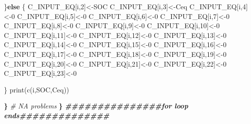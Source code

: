 \documentclass[
  10pt,
  b5paper,
]{book}
\newenvironment{Shaded}{\begin{snugshade}}{\end{snugshade}}
\newcommand{\CommentTok}[1]{\textcolor[rgb]{0.56,0.35,0.01}{\textit{#1}}}
\newcommand{\ControlFlowTok}[1]{\textcolor[rgb]{0.13,0.29,0.53}{\textbf{#1}}}
\newcommand{\DecValTok}[1]{\textcolor[rgb]{0.00,0.00,0.81}{#1}}
\newcommand{\DocumentationTok}[1]{\textcolor[rgb]{0.56,0.35,0.01}{\textbf{\textit{#1}}}}
\newcommand{\ErrorTok}[1]{\textcolor[rgb]{0.64,0.00,0.00}{\textbf{#1}}}
\newcommand{\FunctionTok}[1]{\textcolor[rgb]{0.00,0.00,0.00}{#1}}
\newcommand{\NormalTok}[1]{#1}
\newcommand{\OtherTok}[1]{\textcolor[rgb]{0.56,0.35,0.01}{#1}}
\begin{document}
\begin{Shaded}
\begin{Highlighting}[]
\NormalTok{    \}}\ControlFlowTok{else}\NormalTok{ \{}
\NormalTok{      C\_INPUT\_EQ[i,}\DecValTok{2}\NormalTok{]}\OtherTok{\textless{}{-}}\NormalTok{SOC}
\NormalTok{      C\_INPUT\_EQ[i,}\DecValTok{3}\NormalTok{]}\OtherTok{\textless{}{-}}\NormalTok{Ceq}
\NormalTok{      C\_INPUT\_EQ[i,}\DecValTok{4}\NormalTok{]}\OtherTok{\textless{}{-}}\DecValTok{0}
\NormalTok{      C\_INPUT\_EQ[i,}\DecValTok{5}\NormalTok{]}\OtherTok{\textless{}{-}}\DecValTok{0}
\NormalTok{      C\_INPUT\_EQ[i,}\DecValTok{6}\NormalTok{]}\OtherTok{\textless{}{-}}\DecValTok{0}
\NormalTok{      C\_INPUT\_EQ[i,}\DecValTok{7}\NormalTok{]}\OtherTok{\textless{}{-}}\DecValTok{0}
\NormalTok{      C\_INPUT\_EQ[i,}\DecValTok{8}\NormalTok{]}\OtherTok{\textless{}{-}}\DecValTok{0}
\NormalTok{      C\_INPUT\_EQ[i,}\DecValTok{9}\NormalTok{]}\OtherTok{\textless{}{-}}\DecValTok{0}
\NormalTok{      C\_INPUT\_EQ[i,}\DecValTok{10}\NormalTok{]}\OtherTok{\textless{}{-}}\DecValTok{0}
\NormalTok{      C\_INPUT\_EQ[i,}\DecValTok{11}\NormalTok{]}\OtherTok{\textless{}{-}}\DecValTok{0}
\NormalTok{      C\_INPUT\_EQ[i,}\DecValTok{12}\NormalTok{]}\OtherTok{\textless{}{-}}\DecValTok{0}
\NormalTok{      C\_INPUT\_EQ[i,}\DecValTok{13}\NormalTok{]}\OtherTok{\textless{}{-}}\DecValTok{0}
\NormalTok{      C\_INPUT\_EQ[i,}\DecValTok{14}\NormalTok{]}\OtherTok{\textless{}{-}}\DecValTok{0}
\NormalTok{      C\_INPUT\_EQ[i,}\DecValTok{15}\NormalTok{]}\OtherTok{\textless{}{-}}\DecValTok{0}
\NormalTok{      C\_INPUT\_EQ[i,}\DecValTok{16}\NormalTok{]}\OtherTok{\textless{}{-}}\DecValTok{0}
\NormalTok{      C\_INPUT\_EQ[i,}\DecValTok{17}\NormalTok{]}\OtherTok{\textless{}{-}}\DecValTok{0}
\NormalTok{      C\_INPUT\_EQ[i,}\DecValTok{18}\NormalTok{]}\OtherTok{\textless{}{-}}\DecValTok{0}
\NormalTok{      C\_INPUT\_EQ[i,}\DecValTok{19}\NormalTok{]}\OtherTok{\textless{}{-}}\DecValTok{0}
\NormalTok{      C\_INPUT\_EQ[i,}\DecValTok{20}\NormalTok{]}\OtherTok{\textless{}{-}}\DecValTok{0}
\NormalTok{      C\_INPUT\_EQ[i,}\DecValTok{21}\NormalTok{]}\OtherTok{\textless{}{-}}\DecValTok{0}
\NormalTok{      C\_INPUT\_EQ[i,}\DecValTok{22}\NormalTok{]}\OtherTok{\textless{}{-}}\DecValTok{0}
\NormalTok{      C\_INPUT\_EQ[i,}\DecValTok{23}\NormalTok{]}\OtherTok{\textless{}{-}}\DecValTok{0}
    
\NormalTok{    \}}
    \FunctionTok{print}\NormalTok{(}\FunctionTok{c}\NormalTok{(i,SOC,Ceq))}
    
  \ErrorTok{\}} \CommentTok{\# NA problems}
\ErrorTok{\}}
\DocumentationTok{\#\#\#\#\#\#\#\#\#\#\#\#\#\#\#for loop ends\#\#\#\#\#\#\#\#\#\#\#\#\#\#}
\end{Highlighting}
\end{Shaded}
\end{document}
